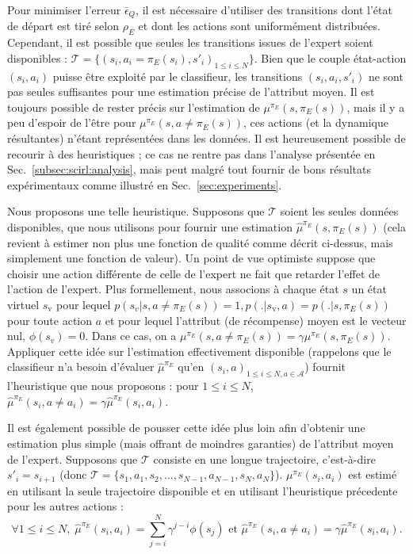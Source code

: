 \documentclass[english,utf8]{./hermes-journal}
\newcommand{\A}{\mathcal{A}}
\newcommand{\T}{\mathcal{T}}
\begin{document}
Pour minimiser l'erreur $\bar{\epsilon}_Q$, il est nécessaire d'utiliser des transitions dont l'état de départ est tiré selon 
$\rho_E$ et dont les actions sont uniformément distribuées. Cependant, il est possible que seules les transitions issues de l'expert soient disponibles : $\T =
\{(s_i,a_i=\pi_E(s_i),s'_i)_{1\leq i \leq N}\}$. Bien que le couple état-action $(s_i,a_i)$ puisse être exploité par le classifieur, les transitions $(s_i,a_i,s'_i)$ ne sont pas seules suffisantes pour une estimation précise de l'attribut moyen. Il est toujours possible de rester précis sur l'estimation de $\mu^{\pi_E}(s,\pi_E(s))$, mais il y a peu d'espoir de l'être pour $\mu^{\pi_E}(s,a\neq\pi_E(s))$, ces actions (et la dynamique résultantes) n'étant représentées dans les données. Il est heureusement possible de recourir à des heuristiques ; ce cas ne rentre pas dans l'analyse présentée en 
Sec.~\ref{subsec:scirl:analysis}, mais peut malgré tout fournir de bons résultats expérimentaux comme illustré en Sec.~\ref{sec:experiments}.


Nous proposons une telle heuristique. Supposons que  $\T$ soient les seules données disponibles, que nous utilisons pour fournir une estimation 
$\hat{\mu}^{\pi_E}(s,\pi_E(s))$ (cela revient à estimer non plus une fonction de qualité comme décrit ci-dessus, mais simplement une fonction de valeur). Un point de vue optimiste suppose que choisir une action différente de celle de l'expert ne fait que retarder l'effet de l'action de l'expert. Plus formellement, nous associons à chaque état $s$ un état virtuel $s_\text{v}$ pour lequel $p(s_v|s,a\neq \pi_E(s))=1,p(.|s_\text{v},a)=p(.|s,\pi_E(s))$ pour toute action $a$ et pour lequel l'attribut (de récompense) moyen est le vecteur nul, $\phi(s_v) = 0$. Dans ce cas, on a
$\mu^{\pi_E}(s,a\neq\pi_E(s)) = \gamma \mu^{\pi_E}(s,\pi_E(s))$.
Appliquer cette idée sur l'estimation effectivement disponible (rappelons que le classifieur n'a besoin d'évaluer  $\hat{\mu}^{\pi_E}$ qu'en
$(s_i,a)_{1\leq i\leq N,a\in \A}$) fournit l'heuristique que nous proposons :
pour $1\leq i\leq N$, $\hat{\mu}^{\pi_E}(s_i,a\neq a_i) = \gamma
\hat{\mu}^{\pi_E}(s_i,a_i)$.

Il est également possible de pousser cette idée plus loin afin d'obtenir une estimation plus simple (mais offrant de moindres garanties) de l'attribut moyen de l'expert.
Supposons que  $\T$ consiste en une longue trajectoire, c'est-à-dire
$s'_i = s_{i+1}$ (donc $\T =
\{s_1,a_1,s_2,\dots,s_{N-1},a_{N-1},s_N,a_N\}$).
$\mu^{\pi_E}(s_i,a_i)$ est estimé en utilisant la seule trajectoire disponible et en utilisant l'heuristique précedente pour les autres actions :
\begin{equation}
  \forall 1\leq i \leq N,\; \hat{\mu}^{\pi_E}(s_i,a_i) =
  \sum_{j=i}^N \gamma^{j-i}\phi(s_j) \text{ et }
  \hat{\mu}^{\pi_E}(s_i,a\neq a_i) = \gamma
  \hat{\mu}^{\pi_E}(s_i,a_i).
  \label{eq:mc_plus_heuristic}
\end{equation}
\end{document}
